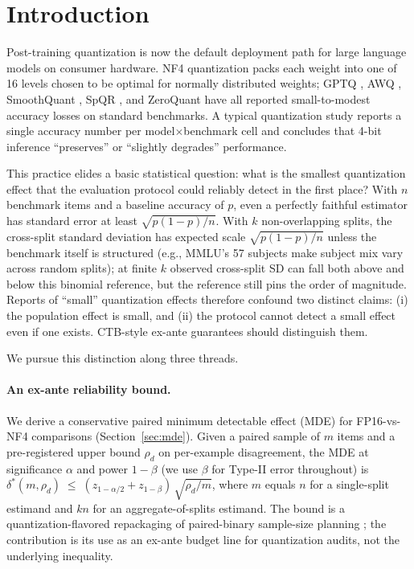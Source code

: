 \documentclass{article}
\begin{document}
\section{Introduction}

Post-training quantization is now the default deployment path for large language models on consumer hardware. NF4 quantization \citep{dettmers2024qlora} packs each weight into one of 16 levels chosen to be optimal for normally distributed weights; GPTQ \citep{frantar2023gptq}, AWQ \citep{lin2023awq}, SmoothQuant \citep{xiao2023smoothquant}, SpQR \citep{dettmers2023spqr}, and ZeroQuant \citep{yao2022zeroquant} have all reported small-to-modest accuracy losses on standard benchmarks. A typical quantization study reports a single accuracy number per model$\times$benchmark cell and concludes that 4-bit inference ``preserves'' or ``slightly degrades'' performance.

This practice elides a basic statistical question: what is the smallest quantization effect that the evaluation protocol could reliably detect in the first place? With $n$ benchmark items and a baseline accuracy of $p$, even a perfectly faithful estimator has standard error at least $\sqrt{p(1-p)/n}$. With $k$ non-overlapping splits, the cross-split standard deviation has expected scale $\sqrt{p(1-p)/n}$ unless the benchmark itself is structured (e.g., MMLU's 57 subjects make subject mix vary across random splits); at finite $k$ observed cross-split SD can fall both above and below this binomial reference, but the reference still pins the order of magnitude. Reports of ``small'' quantization effects therefore confound two distinct claims: (i) the population effect is small, and (ii) the protocol cannot detect a small effect even if one exists. CTB-style ex-ante guarantees should distinguish them.

We pursue this distinction along three threads.

\paragraph{An ex-ante reliability bound.}
We derive a conservative paired minimum detectable effect (MDE) for FP16-vs-NF4 comparisons (Section~\ref{sec:mde}). Given a paired sample of $m$ items and a pre-registered upper bound $\rho_d$ on per-example disagreement, the MDE at significance $\alpha$ and power $1-\beta$ (we use $\beta$ for Type-II error throughout) is
$\delta^*(m, \rho_d) \;\le\; (z_{1-\alpha/2} + z_{1-\beta})\,\sqrt{\rho_d/m}$,
where $m$ equals $n$ for a single-split estimand and $kn$ for an aggregate-of-splits estimand. The bound is a quantization-flavored repackaging of paired-binary sample-size planning \citep{miettinen1968matched, connor1987sample, lachin1992sample}; the contribution is its use as an ex-ante budget line for quantization audits, not the underlying inequality.
\end{document}
